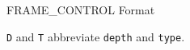 \begin{manuallistedformatdiagram}{FRAME\_CONTROL Format}
\end{manuallistedformatdiagram}
{\small\texttt{D} and \texttt{T} abbreviate \texttt{depth} and \texttt{type}.\par}
